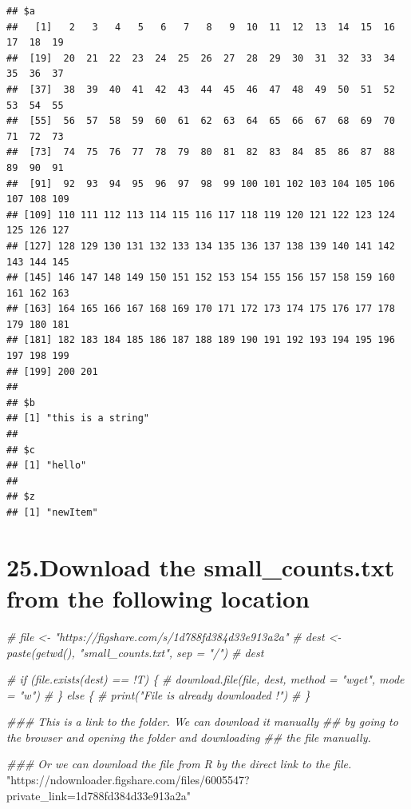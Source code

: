 \documentclass[]{article}
\newenvironment{Shaded}{\begin{snugshade}}{\end{snugshade}}
\newcommand{\CommentTok}[1]{\textcolor[rgb]{0.56,0.35,0.01}{\textit{#1}}}
\newcommand{\StringTok}[1]{\textcolor[rgb]{0.31,0.60,0.02}{#1}}
\begin{document}
\begin{verbatim}
## $a
##   [1]   2   3   4   5   6   7   8   9  10  11  12  13  14  15  16  17  18  19
##  [19]  20  21  22  23  24  25  26  27  28  29  30  31  32  33  34  35  36  37
##  [37]  38  39  40  41  42  43  44  45  46  47  48  49  50  51  52  53  54  55
##  [55]  56  57  58  59  60  61  62  63  64  65  66  67  68  69  70  71  72  73
##  [73]  74  75  76  77  78  79  80  81  82  83  84  85  86  87  88  89  90  91
##  [91]  92  93  94  95  96  97  98  99 100 101 102 103 104 105 106 107 108 109
## [109] 110 111 112 113 114 115 116 117 118 119 120 121 122 123 124 125 126 127
## [127] 128 129 130 131 132 133 134 135 136 137 138 139 140 141 142 143 144 145
## [145] 146 147 148 149 150 151 152 153 154 155 156 157 158 159 160 161 162 163
## [163] 164 165 166 167 168 169 170 171 172 173 174 175 176 177 178 179 180 181
## [181] 182 183 184 185 186 187 188 189 190 191 192 193 194 195 196 197 198 199
## [199] 200 201
## 
## $b
## [1] "this is a string"
## 
## $c
## [1] "hello"
## 
## $z
## [1] "newItem"
\end{verbatim}

\hypertarget{download-the-small_counts.txt-from-the-following-location}{%
\section{25.Download the small\_counts.txt from the following
location}\label{download-the-small_counts.txt-from-the-following-location}}

\begin{Shaded}
\begin{Highlighting}[]
\CommentTok{# file <- "https://figshare.com/s/1d788fd384d33e913a2a"}
\CommentTok{# dest <- paste(getwd(), "small_counts.txt", sep = "/")}
\CommentTok{# dest}

\CommentTok{# if (file.exists(dest) == !T) \{}
\CommentTok{#  download.file(file, dest, method = "wget", mode = "w")}
\CommentTok{# \} else \{}
\CommentTok{#  print("File is already downloaded !")}
\CommentTok{# \}}

\CommentTok{### This is a link to the folder. We can download it manually }
\CommentTok{## by going to the browser and opening the folder and downloading }
\CommentTok{## the file manually.}

\CommentTok{### Or we can download the file from R by the direct link to the file.}
\StringTok{"https://ndownloader.figshare.com/files/6005547?private_link=1d788fd384d33e913a2a"}
\end{Highlighting}
\end{Shaded}
\end{document}
